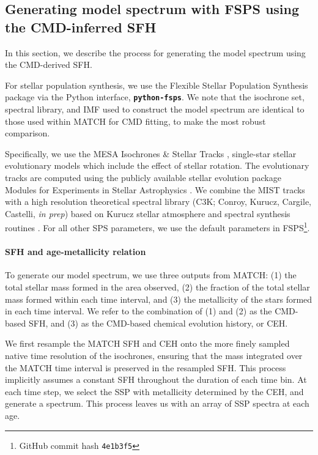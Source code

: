\documentclass[preprint2]{aastex62}
\newcommand{\FSPS}{{\sc FSPS}\xspace}
\newcommand{\pFSPS}{{\tt \textbf{python-fsps}}\xspace}
\begin{document}
\subsection{Generating model spectrum with FSPS using the CMD-inferred SFH}\label{sec:methods:fsps}

In this section, we describe the process for generating the model spectrum using the CMD-derived SFH. 

For stellar population synthesis, we use the Flexible Stellar Population Synthesis package \citep[\FSPS;][]{Conroy+2009, Conroy+2010} via the Python interface, \pFSPS \citep{pythonFSPSdfm}. We note that the isochrone set, spectral library, and IMF used to construct the model spectrum are identical to those used within MATCH for CMD fitting, to make the most robust comparison.

Specifically, we use the MESA Isochrones \& Stellar Tracks \citep[MIST;][]{Dotter+2016, Choi+2016}, single-star stellar evolutionary models which include the effect of stellar rotation. The evolutionary tracks are computed using the publicly available stellar evolution package Modules for Experiments in Stellar Astrophysics \citep[MESA v7503;][]{Paxton+2011,Paxton+2013, Paxton+2015}. We combine the MIST tracks with a high resolution theoretical spectral library (C3K; Conroy, Kurucz, Cargile, Castelli, \emph{in prep}) based on Kurucz stellar atmosphere and spectral synthesis routines \citep[ATLAS12 and SYNTHE,][]{Kurucz+2005}. For all other SPS parameters, we use the default parameters in \FSPS\footnote{GitHub commit hash \texttt{4e1b3f5}}.

\paragraph{SFH and age-metallicity relation}
To generate our model spectrum, we use three outputs from MATCH: (1) the total stellar mass formed in the area observed, (2) the fraction of the total stellar mass formed within each time interval, and (3) the metallicity of the stars formed in each time interval. We refer to the combination of (1) and (2) as the CMD-based SFH, and (3) as the CMD-based chemical evolution history, or CEH.

We first resample the MATCH SFH and CEH onto the more finely sampled native time resolution of the isochrones, ensuring that the mass integrated over the MATCH time interval is preserved in the resampled SFH. This process implicitly assumes a constant SFH throughout the duration of each time bin. At each time step, we select the SSP with metallicity determined by the CEH, and generate a spectrum. This process leaves us with an array of SSP spectra at each age.
\end{document}
